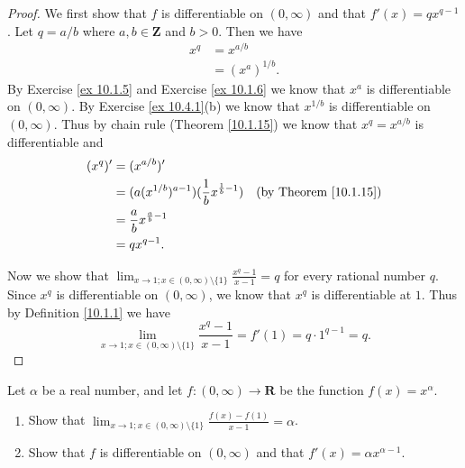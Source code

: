 \begin{proof}
    We first show that \(f\) is differentiable on \((0, \infty)\) and that \(f'(x) = q x^{q - 1}\).
    Let \(q = a / b\) where \(a, b \in \mathbf{Z}\) and \(b > 0\).
    Then we have
    \begin{align*}
        x^q & = x^{a / b}      \\
            & = (x^a)^{1 / b}.
    \end{align*}
    By Exercise \ref{ex 10.1.5} and Exercise \ref{ex 10.1.6} we know that \(x^a\) is differentiable on \((0, \infty)\).
    By Exercise \ref{ex 10.4.1}(b) we know that \(x^{1 / b}\) is differentiable on \((0, \infty)\).
    Thus by chain rule (Theorem \ref{10.1.15}) we know that \(x^q = x^{a / b}\) is differentiable and
    \begin{align*}
        (x^q)' & = (x^{a / b})'                                                                                 \\
               & = (a(x^{1 / b})^{a - 1}) (\frac{1}{b} x^{\frac{1}{b} - 1}) & \text{(by Theorem \ref{10.1.15})} \\
               & = \frac{a}{b} x^{\frac{a}{b} - 1}                                                              \\
               & = q x^{q - 1}.
    \end{align*}

    Now we show that \(\lim_{x \to 1 ; x \in (0, \infty) \setminus \{1\}} \frac{x^q - 1}{x - 1} = q\) for every rational number \(q\).
    Since \(x^q\) is differentiable on \((0, \infty)\), we know that \(x^q\) is differentiable at \(1\).
    Thus by Definition \ref{10.1.1} we have
    \[
        \lim_{x \to 1 ; x \in (0, \infty) \setminus \{1\}} \frac{x^q - 1}{x - 1} = f'(1) = q \cdot 1^{q - 1} = q.
    \]
\end{proof}

\begin{exercise}\label{ex 10.4.3}
    Let \(\alpha\) be a real number, and let \(f : (0, \infty) \to \mathbf{R}\) be the function \(f(x) = x^{\alpha}\).
    \begin{enumerate}
        \item Show that \(\lim_{x \to 1 ; x \in (0, \infty) \setminus \{1\}} \frac{f(x) - f(1)}{x - 1} = \alpha\).
        \item Show that \(f\) is differentiable on \((0, \infty)\) and that \(f'(x) = \alpha x^{\alpha - 1}\).
    \end{enumerate}
\end{exercise}

